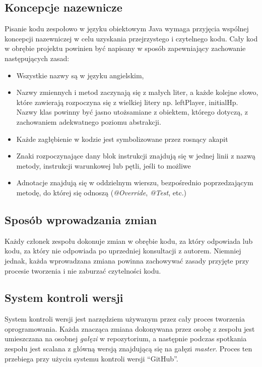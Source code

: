\documentclass[11pt,a4paper]{report}
\begin{document}
\subsection {Koncepcje nazewnicze}
Pisanie kodu zespołowo w języku obiektowym Java wymaga przyjęcia wspólnej koncepcji nazewniczej w celu uzyskania przejrzystego i czytelnego kodu. Cały kod w obrębie projektu powinien być napisany w sposób zapewniający zachowanie następujących zasad:\\
\begin{itemize}
\item{}Wszystkie nazwy są w języku angielskim,
\item{}Nazwy zmiennych i metod zaczynają się z małych liter, a każde kolejne słowo, które zawierają rozpoczyna się z wielkiej litery np. leftPlayer, initialHp. Nazwy klas powinny być jasno utożsamiane z obiektem, którego dotyczą, z zachowaniem adekwatnego poziomu abstrakcji.
\item{}Każde zagłębienie w kodzie jest symbolizowane przez rosnący akapit
\item{}Znaki rozpoczynające dany blok instrukcji znajdują się w jednej linii z nazwą metody, instrukcji warunkowej lub pętli, jeśli to możliwe
\item{}Adnotacje znajdują się w oddzielnym wierszu, bezpośrednio poprzedzającym metodę, do której się odnoszą (\textsl{@Override}, \textsl{@Test}, etc.)
\end{itemize}

\subsection {Sposób wprowadzania zmian}
Każdy członek zespołu dokonuje zmian w obrębie kodu, za który odpowiada lub kodu, za który nie odpowiada po uprzedniej konsultacji z autorem. Niemniej jednak, każda wprowadzana zmiana powinna zachowywać zasady przyjęte przy procesie tworzenia i nie zaburzać czytelności kodu.
\subsection {System kontroli wersji}
System kontroli wersji jest narzędziem używanym przez cały proces tworzenia oprogramowania. Każda znacząca zmiana dokonywana przez osobę z zespołu jest umieszczana na osobnej \textsl{gałęzi} w repozytorium, a następnie podczas spotkania zespołu jest scalana z główną wersją znajdującą się na gałęzi \textsl{master}. Proces ten przebiega przy użyciu systemu kontroli wersji “GitHub”.
\end{document}
